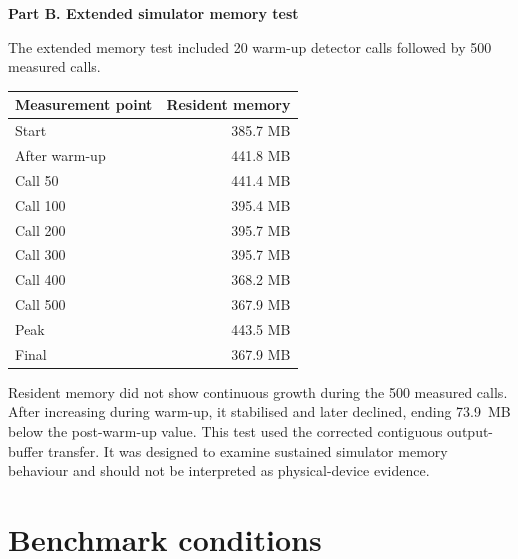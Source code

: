 \documentclass[preprint,12pt,authoryear]{elsarticle}
\newcommand{\tabletail}{\par\addvspace{\bigskipamount}}
\begin{document}
\noindent\textbf{Part B. Extended simulator memory test}

The extended memory test included 20 warm-up detector calls followed by 500
measured calls.

\begin{center}
\footnotesize
\setlength{\tabcolsep}{8pt}
\begin{tabular}{l r}
\toprule
Measurement point & Resident memory \\
\midrule
Start              & 385.7 MB \\
After warm-up      & 441.8 MB \\
Call 50            & 441.4 MB \\
Call 100           & 395.4 MB \\
Call 200           & 395.7 MB \\
Call 300           & 395.7 MB \\
Call 400           & 368.2 MB \\
Call 500           & 367.9 MB \\
Peak               & 443.5 MB \\
Final              & 367.9 MB \\
\bottomrule
\end{tabular}
\end{center}

{\footnotesize
Resident memory did not show continuous growth during the 500 measured calls.
After increasing during warm-up, it stabilised and later declined, ending
73.9~MB below the post-warm-up value. This test used the corrected contiguous
output-buffer transfer. It was designed to examine sustained simulator memory
behaviour and should not be interpreted as physical-device evidence.
\par}

\tabletail

\section{Benchmark conditions}
\label{sup:conditions}
\end{document}

